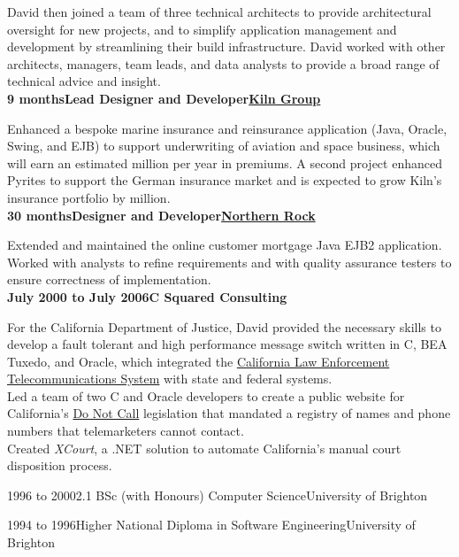 \documentclass[a4paper,12pt]{article}
\newcommand{\head}[1]{\begin{center}{\large{\textbf{\sc{#1}}}}\nopagebreak\end{center}}
\newcommand{\jobheld}[2]{\textbf{#1\hfill #2}\nopagebreak}
\newcommand{\clientwork}[3]{\textbf{#1\hfill#3\hfill#2}\nopagebreak}
\newcommand{\tab}{\hspace{2em}}
\newcommand{\education}[3]{#1\tab#2\hfill#3}
\begin{document}
David then joined a team of three technical architects to provide architectural oversight for new projects, and to simplify application management and development by streamlining their build infrastructure. David worked with other architects, managers, team leads, and data analysts to provide a broad range of technical advice and insight.\\

\clientwork{9 months}{\href{http://kilngroup.com/}{Kiln Group}}{Lead Designer and Developer}

Enhanced a bespoke marine insurance and reinsurance application (Java, Oracle, Swing, and EJB) to support underwriting of aviation and space business, which will earn an estimated  million per year in premiums. A second project enhanced Pyrites to support the German insurance market and is expected to grow  Kiln's insurance portfolio by  million.\\

\clientwork{30 months}{\href{http://www.northernrock.co.uk}{Northern Rock}}{Designer and Developer}

Extended and maintained the online customer mortgage Java EJB2 application. Worked with analysts to refine requirements and with quality assurance testers to ensure correctness of implementation.\\

\jobheld{July 2000 to July 2006}{C Squared Consulting}

For the California Department of Justice, David provided the necessary skills to develop a fault tolerant and high performance message switch written in C, BEA Tuxedo, and Oracle, which integrated the \href{http://definitions.uslegal.com/c/clets/}{California Law Enforcement Telecommunications System} with state and federal systems.\\

Led a team of two C and Oracle developers to create a public website for California's \href{http://www.sfgate.com/cgi-bin/article.cgi?f=/c/a/2003/03/31/MN5478.DTL}{Do Not Call} legislation that mandated a registry of names and phone numbers that telemarketers cannot contact.\\

Created \emph{XCourt}, a .NET solution to automate California's manual court disposition process.\\

\head{Education}

\education{1996 to 2000}{2.1 BSc (with Honours) Computer Science}{University of Brighton}

\education{1994 to 1996}{Higher National Diploma in Software Engineering}{University of Brighton}
\end{document}
